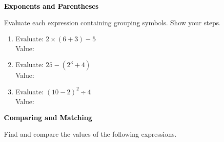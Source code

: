 \documentclass[12pt, letterpaper, fleqn]{article}
\newcommand{\blanklong}{\underline{\hspace{6.5cm}}}
\begin{document}
\newpage

\begin{tcolorbox}[colback=black!10]
\large\textcolor{black}{\textbf{Exponents and Parentheses}}
\end{tcolorbox}

\noindent
Evaluate each expression containing grouping symbols. Show your steps.

\vspace{3mm}

\begin{enumerate}[itemsep=2.2cm, leftmargin=0.6cm]

\item Evaluate: $2 \times (6 + 3) - 5$ \\
Value: \blanklong

\vspace{2cm}

\item Evaluate: $25 - (2^3 + 4)$ \\
Value: \blanklong

\vspace{2cm}

\item Evaluate: $(10 - 2)^2 \div 4$ \\
Value: \blanklong

\vspace{2cm}

\end{enumerate}

\newpage

\begin{tcolorbox}[colback=black!10]
\large\textcolor{black}{\textbf{Comparing and Matching}}
\end{tcolorbox}

\noindent
Find and compare the values of the following expressions.

\vspace{3mm}
\end{document}
